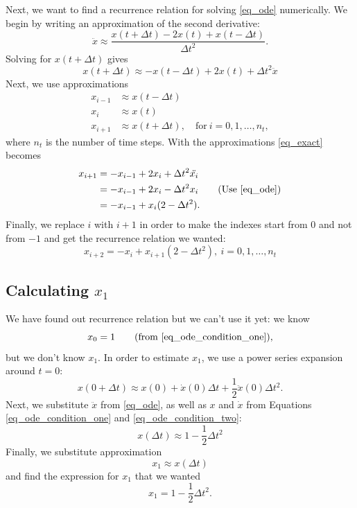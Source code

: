 Next, we want to find a recurrence relation for solving \autoref{eq_ode} numerically. We begin by writing an approximation of the second derivative:
\[
  \ddot{x} \approx \frac{x(t + \Delta t) - 2 x(t) + x(t - \Delta t)}{\Delta t^2}.
\]
Solving for $ x(t + \Delta t)$ gives
\begin{equation}
  x(t + \Delta t) \approx - x(t - \Delta t) + 2 x(t) + \Delta t^2 \ddot{x}
  \label{eq_exact}
\end{equation}
Next, we use approximations
\begin{align*}
  x_{i-1} &\approx x(t - \Delta t) \\
  x_{i} &\approx x(t) \\
  x_{i+1} &\approx x(t + \Delta t), \quad \textrm{for} \ i = 0, 1, \dots , n_t,
\end{align*}
where $n_t$ is the number of time steps.
With the approximations \autoref{eq_exact} becomes
\begin{align*}
  x_{i+1} &= - x_{i-1} + 2 x_{i} + \Delta t^2 \ddot{x_{i}} \\
    &= - x_{i-1} + 2 x_{i} - \Delta t^2 x_{i} \tag{Use \autoref{eq_ode}}\\
    &= - x_{i-1} + x_{i} (2 - \Delta t^2 ).
\end{align*}
Finally, we replace $i$ with $i+1$ in order to make the indexes start from $0$ and not from $-1$ and get the recurrence relation we wanted:
\begin{equation}
  \boxed{ x_{i+2} = - x_{i} + x_{i+1} (2 - \Delta t^2 ), \ i = 0, 1, \dots , n_t }
  \label{eq_reccurence_relation}
\end{equation}

\subsection{Calculating $x_1$}

We have found out recurrence relation but we can't use it yet: we know
\[
  x_0 = 1 \tag{from \autoref{eq_ode_condition_one}},
\]
but we don't know $x_1$. In order to estimate $x_1$, we use a power series expansion around $t=0$:
\[
  x(0 + \Delta t) \approx x(0) + \dot{x}(0) \Delta t + \frac{1}{2} \ddot{x}(0) \Delta t^2.
\]
Next, we substitute $\ddot{x}$ from \autoref{eq_ode}, as well as $x$ and $\dot{x}$ from Equations \ref{eq_ode_condition_one} and \ref{eq_ode_condition_two}:
\[
  x(\Delta t) \approx 1 - \frac{1}{2} \Delta t^2
\]
Finally, we substitute approximation
\[
  x_1 \approx x(\Delta t)
\]
and find the expression for $x_1$ that we wanted
\[
    \boxed{ x_1 = 1 - \frac{1}{2} \Delta t^2. }
\]


